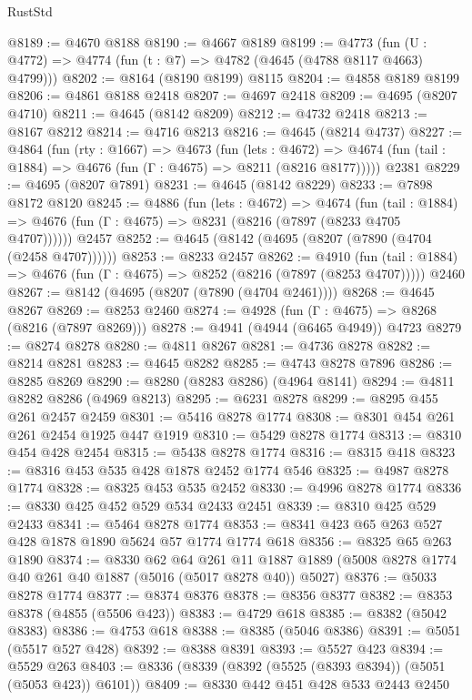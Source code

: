 \begin{lexlean}{RustStd}
\begin{coremodule}
@8189 := @4670 @8188
@8190 := @4667 @8189
@8199 := @4773 (fun (U : @4772) => @4774 (fun (t : @7) => @4782 (@4645 (@4788 @8117 @4663) @4799)))
@8202 := @8164 (@8190 @8199) @8115
@8204 := @4858 @8189 @8199
@8206 := @4861 @8188 @2418
@8207 := @4697 @2418
@8209 := @4695 (@8207 @4710)
@8211 := @4645 (@8142 @8209)
@8212 := @4732 @2418
@8213 := @8167 @8212
@8214 := @4716 @8213
@8216 := @4645 (@8214 @4737)
@8227 := @4864
    (fun (rty : @1667) =>
    @4673
      (fun (lets : @4672) =>
      @4674 (fun (tail : @1884) => @4676 (fun (Γ : @4675) => @8211 (@8216 @8177)))))
    @2381
@8229 := @4695 (@8207 @7891)
@8231 := @4645 (@8142 @8229)
@8233 := @7898 @8172 @8120
@8245 := @4886
    (fun (lets : @4672) =>
    @4674
      (fun (tail : @1884) => @4676 (fun (Γ : @4675) => @8231 (@8216 (@7897 (@8233 @4705 @4707))))))
    @2457
@8252 := @4645 (@8142 (@4695 (@8207 (@7890 (@4704 (@2458 @4707))))))
@8253 := @8233 @2457
@8262 := @4910
    (fun (tail : @1884) => @4676 (fun (Γ : @4675) => @8252 (@8216 (@7897 (@8253 @4707)))))
    @2460
@8267 := @8142 (@4695 (@8207 (@7890 (@4704 @2461))))
@8268 := @4645 @8267
@8269 := @8253 @2460
@8274 := @4928 (fun (Γ : @4675) => @8268 (@8216 (@7897 @8269)))
@8278 := @4941 (@4944 (@6465 @4949)) @4723
@8279 := @8274 @8278
@8280 := @4811 @8267
@8281 := @4736 @8278
@8282 := @8214 @8281
@8283 := @4645 @8282
@8285 := @4743 @8278 @7896
@8286 := @8285 @8269
@8290 := @8280 (@8283 @8286) (@4964 @8141)
@8294 := @4811 @8282 @8286 (@4969 @8213)
@8295 := @6231 @8278
@8299 := @8295 @455 @261 @2457 @2459
@8301 := @5416 @8278 @1774
@8308 := @8301 @454 @261 @261 @2454 @1925 @447 @1919
@8310 := @5429 @8278 @1774
@8313 := @8310 @454 @428 @2454
@8315 := @5438 @8278 @1774
@8316 := @8315 @418
@8323 := @8316 @453 @535 @428 @1878 @2452 @1774 @546
@8325 := @4987 @8278 @1774
@8328 := @8325 @453 @535 @2452
@8330 := @4996 @8278 @1774
@8336 := @8330 @425 @452 @529 @534 @2433 @2451
@8339 := @8310 @425 @529 @2433
@8341 := @5464 @8278 @1774
@8353 := @8341 @423 @65 @263 @527 @428 @1878 @1890 @5624 @57 @1774 @1774 @618
@8356 := @8325 @65 @263 @1890
@8374 := @8330
    @62
    @64
    @261
    @11
    @1887
    @1889
    (@5008 @8278 @1774 @40 @261 @40 @1887 (@5016 (@5017 @8278 @40)) @5027)
@8376 := @5033 @8278 @1774
@8377 := @8374 @8376
@8378 := @8356 @8377
@8382 := @8353 @8378 (@4855 (@5506 @423))
@8383 := @4729 @618
@8385 := @8382 (@5042 @8383)
@8386 := @4753 @618
@8388 := @8385 (@5046 @8386)
@8391 := @5051 (@5517 @527 @428)
@8392 := @8388 @8391
@8393 := @5527 @423
@8394 := @5529 @263
@8403 := @8336 (@8339 (@8392 (@5525 (@8393 @8394)) (@5051 (@5053 @423)) @6101))
@8409 := @8330 @442 @451 @428 @533 @2443 @2450

\end{coremodule}
\end{lexlean}
